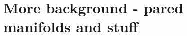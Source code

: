 \documentclass[12pt]{amsart}
\theoremstyle{definition}
\newcommand{\Si}{\Sigma}
\begin{document}
%
%
%
%
%

\section{More background - pared manifolds and stuff}
\end{document}
